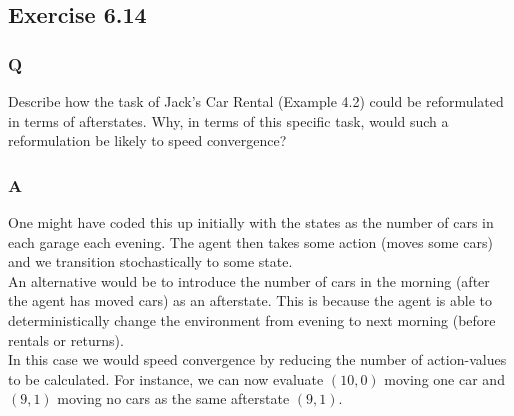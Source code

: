 \subsection{Exercise 6.14}
\subsubsection*{Q}
Describe how the task of Jack’s Car Rental (Example 4.2) could be reformulated in terms of afterstates. Why, in terms of this specific task, would such a reformulation be likely to speed convergence?

\subsubsection*{A}
One might have coded this up initially with the states as the number of cars in each garage each evening. The agent then takes some action (moves some cars) and we transition stochastically to some state.\\

An alternative would be to introduce the number of cars in the morning (after the agent has moved cars) as an afterstate. This is because the agent is able to deterministically change the environment from evening to next morning (before rentals or returns).\\

In this case we would speed convergence by reducing the number of action-values to be calculated. For instance, we can now evaluate $(10, 0)$ moving one car and $(9, 1)$ moving no cars as the same afterstate $(9, 1)$.

